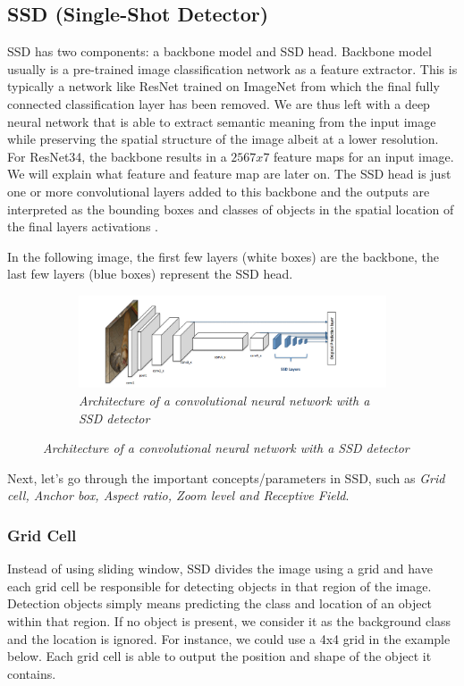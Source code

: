 \subsection{SSD (Single-Shot Detector)}
SSD has two components: a backbone model and SSD head. Backbone model usually
is a pre-trained image classification network as a feature extractor. This is
typically a network like ResNet trained on ImageNet from which the final fully
connected classification layer has been removed. We are thus left with a deep
neural network that is able to extract semantic meaning from the input image
while preserving the spatial structure of the image albeit at a lower resolution.
For ResNet34, the backbone results in a $256 7x7$ feature maps for an input
image. We will explain what feature and feature map are later on. The SSD head
is just one or more convolutional layers added to this backbone and the outputs
are interpreted as the bounding boxes and classes of objects in the spatial
location of the final layers activations \cite{ssd_1}.

In the following image, the first few layers (white boxes) are the backbone,
the last few layers (blue boxes) represent the SSD head.

\begin{figure}[H]
    \centering
    \begin{subfigure}[b]{0.8\textwidth}
        \centering
        \includegraphics[width=\textwidth]{Figures/2. Related Work/ssd_1.png}
        \caption{\textit{
                Architecture of a convolutional neural network with a SSD detector
            } \cite{ssd_image}}
    \end{subfigure}
\end{figure}

Next, let's go through the important concepts/parameters in SSD, such as
\textit{Grid cell, Anchor box, Aspect ratio, Zoom level and Receptive Field}.

\subsubsection{Grid Cell}
Instead of using sliding window, SSD divides the image using a grid and have
each grid cell be responsible for detecting objects in that region of the image.
Detection objects simply means predicting the class and location of an object
within that region. If no object is present, we consider it as the background
class and the location is ignored. For instance, we could use a 4x4 grid in the
example below. Each grid cell is able to output the position and shape of the
object it contains.


